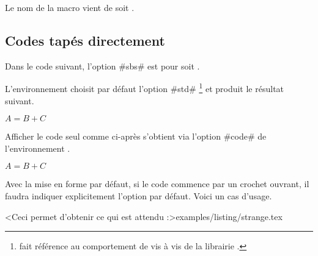 \begin{bdocrem}
    Le nom de la macro  vient de  soit .
\end{bdocrem}




\subsection{Codes tapés directement}

\begin{bdocexa}
	Dans le code suivant, l'option \bdocinlatex#sbs# est pour  soit .
	
\end{bdocexa}




\begin{bdocexa}[À la suite]
	L'environnement  choisit par défaut l'option \bdocinlatex#std#
	\footnote{
    	 fait référence au comportement  de  vis à vis de la librairie .
	}
	et produit le résultat suivant.

	\begin{bdoclatex}
		$A = B + C$
	\end{bdoclatex}
\end{bdocexa}	




\begin{bdocexa}
	Afficher le code seul comme ci-après s'obtient via l'option \bdocinlatex#code# de l'environnement .

	\begin{bdoclatex}[code]
    	$A = B + C$
	\end{bdoclatex}
\end{bdocexa}




\begin{bdocwarning}	
	Avec la mise en forme par défaut, si le code commence par un crochet ouvrant, il faudra indiquer explicitement l'option par défaut. Voici un cas d'usage.
	
	\bdoclatexshow*<Ceci permet d'obtenir ce qui est attendu :>{examples/listing/strange.tex}
\end{bdocwarning}


